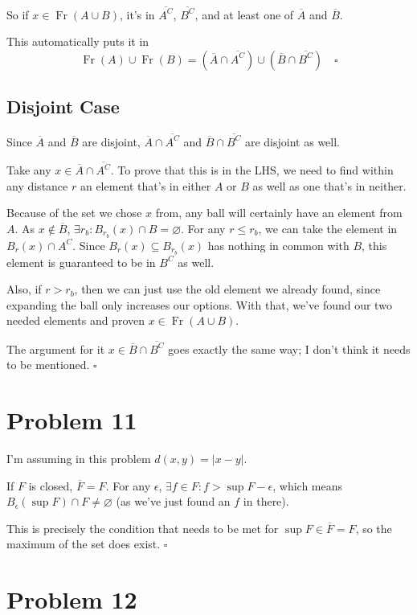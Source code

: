 \documentclass[12pt]{article}
\DeclareMathOperator{\Fr}{Fr}
\begin{document}
So if $x \in \Fr(A \cup B)$, it's in $\overline{A^C}$, $\overline{B^C}$,
and at least one of $\overline{A}$ and $\overline{B}$.

This automatically puts it in
\[\Fr(A) \cup \Fr(B)=\left(\overline{A} \cap \overline{A^C}\right) \cup \left(\overline{B} \cap \overline{B^C}\right)\quad\square\]

\subsection{Disjoint Case}

Since $\overline{A}$ and $\overline{B}$ are disjoint,
$\overline{A} \cap \overline{A^C}$ and $\overline{B} \cap \overline{B^C}$ are disjoint as well.

Take any $x \in \overline{A} \cap \overline{A^C}$.
To prove that this is in the LHS, we need to find within any distance $r$
an element that's in either $A$ or $B$ as well as one that's in neither.

Because of the set we chose $x$ from, any ball will certainly have an element from $A$.
As $x \notin \overline{B}$, $\exists r_b: B_{r_b}(x) \cap B = \varnothing$.
For any $r \le r_b$, we can take the element in $B_r(x) \cap A^C$.
Since $B_r(x) \subseteq B_{r_b}(x)$ has nothing in common with $B$,
this element is guaranteed to be in $B^C$ as well.

Also, if $r > r_b$, then we can just use the old element we already found,
since expanding the ball only increases our options.
With that, we've found our two needed elements and proven $x \in \Fr(A \cup B)$.

The argument for it $x \in \overline{B} \cap \overline{B^C}$ goes
exactly the same way; I don't think it needs to be mentioned. $\square$

\section{Problem 11}

I'm assuming in this problem $d(x, y)=|x-y|$.

If $F$ is closed, $\overline{F}=F$.
For any $\epsilon$, $\exists f \in F: f > \sup F - \epsilon$,
which means $B_\epsilon(\sup F) \cap F \ne \varnothing$
(as we've just found an $f$ in there).

This is precisely the condition that needs to be met for $\sup F \in \overline{F}=F$,
so the maximum of the set does exist. $\square$

\section{Problem 12}
\end{document}
